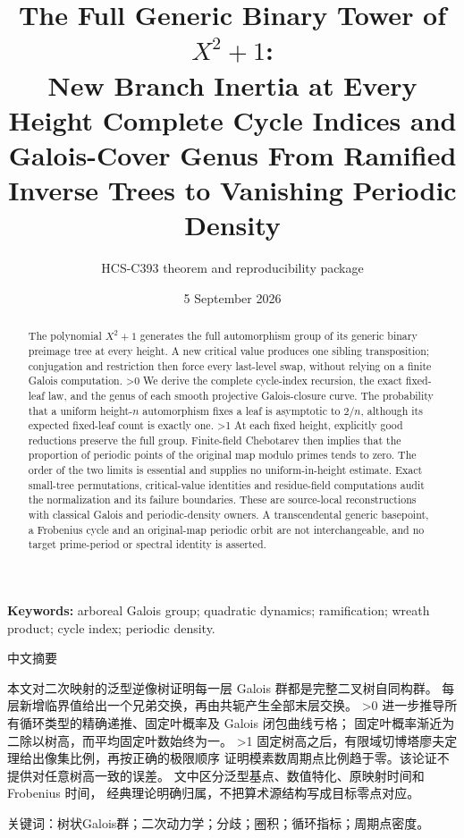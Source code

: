 \documentclass[10pt]{article}
\title{The Full Generic Binary Tower of $X^2+1$:\\
\ifcase\CRevisionRound New Branch Inertia at Every Height
\or Complete Cycle Indices and Galois-Cover Genus
\else From Ramified Inverse Trees to Vanishing Periodic Density\fi}
\author{HCS-C393 theorem and reproducibility package}
\date{5 September 2026}
\begin{document}
\maketitle
\begin{abstract}
The polynomial $X^2+1$ generates the full automorphism group of its generic
binary preimage tree at every height. A new critical value produces one
sibling transposition; conjugation and restriction then force every
last-level swap, without relying on a finite Galois computation.
\ifnum\CRevisionRound>0
We derive the complete cycle-index recursion, the exact fixed-leaf law,
and the genus of each smooth projective Galois-closure curve. The probability
that a uniform height-$n$ automorphism fixes a leaf is asymptotic to $2/n$,
although its expected fixed-leaf count is exactly one.
\fi
\ifnum\CRevisionRound>1
At each fixed height, explicitly good reductions preserve the full group.
Finite-field Chebotarev then implies that the proportion of periodic points
of the original map modulo primes tends to zero. The order of the two
limits is essential and supplies no uniform-in-height estimate.
\fi
Exact small-tree permutations, critical-value identities and residue-field
computations audit the normalization and its failure boundaries.
These are source-local reconstructions with classical Galois and
periodic-density owners. A transcendental generic basepoint, a Frobenius
cycle and an original-map periodic orbit are not interchangeable, and no
target prime-period or spectral identity is asserted.
\end{abstract}
\noindent\textbf{Keywords:} arboreal Galois group; quadratic dynamics; ramification; wreath product; cycle index; periodic density.
\begin{otherlanguage}{chinese-simplified}
\begin{center}{\large 中文摘要}\end{center}
\begin{sloppypar}
本文对二次映射的泛型逆像树证明每一层 \foreignlanguage{english}{Galois} 群都是完整二叉树自同构群。
每层新增临界值给出一个兄弟交换，再由共轭产生全部末层交换。
\ifnum\CRevisionRound>0
进一步推导所有循环类型的精确递推、固定叶概率及 \foreignlanguage{english}{Galois} 闭包曲线亏格；
固定叶概率渐近为二除以树高，而平均固定叶数始终为一。
\fi
\ifnum\CRevisionRound>1
固定树高之后，有限域切博塔廖夫定理给出像集比例，再按正确的极限顺序
证明模素数周期点比例趋于零。该论证不提供对任意树高一致的误差。
\fi
文中区分泛型基点、数值特化、原映射时间和 \foreignlanguage{english}{Frobenius} 时间，
经典理论明确归属，不把算术源结构写成目标零点对应。
\end{sloppypar}
\noindent 关键词：树状\foreignlanguage{english}{Galois}群；二次动力学；分歧；圈积；循环指标；周期点密度。
\end{otherlanguage}
\end{document}
